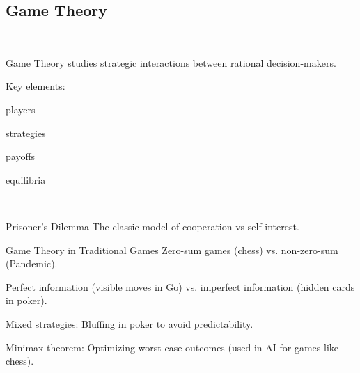 \begin{frame}[standout]
    \onslide<+->
\end{frame}

\subsection{Game Theory}

\begin{frame}{\insertsection\ \insertsubsection}
    \onslide<+->

    \alert{Game Theory} studies \alert<2>{strategic interactions} between \alert<3>{rational} \alert<4>{decision-makers}.

    \vspace{2em}

    Key elements:
    \begin{multicols}{4}
        \centering
        players

        strategies

        payoffs

        equilibria
    \end{multicols}
\end{frame}

\begin{frame}[standout]
    \onslide<+->
\end{frame}

\begin{frame}{\insertsection\ \insertsubsection}
    \onslide<+->

    \begin{exampleblock}{Prisoner’s Dilemma}
        The classic model of cooperation vs self-interest.
    \end{exampleblock}
\end{frame}

\begin{frame}{\insertsection}
    Game Theory in Traditional Games
Zero-sum games (chess) vs. non-zero-sum (Pandemic).

Perfect information (visible moves in Go) vs. imperfect information (hidden cards in poker).

Mixed strategies: Bluffing in poker to avoid predictability.

Minimax theorem: Optimizing worst-case outcomes (used in AI for games like chess).


\end{frame}
